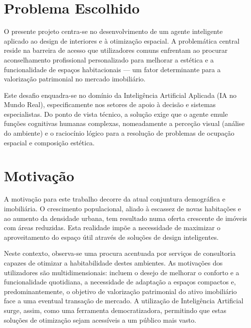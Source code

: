 \documentclass[a4paper,12pt]{scrreprt}
\begin{document}
    \section{Problema Escolhido}
        O presente projeto centra-se no desenvolvimento de um agente inteligente aplicado ao design de interiores e à otimização espacial. A problemática central reside na barreira de acesso que utilizadores comuns enfrentam ao procurar aconselhamento profissional personalizado para melhorar a estética e a funcionalidade de espaços habitacionais — um fator determinante para a valorização patrimonial no mercado imobiliário.

        Este desafio enquadra-se no domínio da Inteligência Artificial Aplicada (IA no Mundo Real), especificamente nos setores de apoio à decisão e sistemas especialistas. Do ponto de vista técnico, a solução exige que o agente emule funções cognitivas humanas complexas, nomeadamente a perceção visual (análise do ambiente) e o raciocínio lógico para a resolução de problemas de ocupação espacial e composição estética.
    \section{Motivação}
        A motivação para este trabalho decorre da atual conjuntura demográfica e imobiliária. O crescimento populacional, aliado à escassez de novas habitações e ao aumento da densidade urbana, tem resultado numa oferta crescente de imóveis com áreas reduzidas. Esta realidade impõe a necessidade de maximizar o aproveitamento do espaço útil através de soluções de design inteligentes.

        Neste contexto, observa-se uma procura acentuada por serviços de consultoria capazes de otimizar a habitabilidade destes ambientes. As motivações dos utilizadores são multidimensionais: incluem o desejo de melhorar o conforto e a funcionalidade quotidiana, a necessidade de adaptação a espaços compactos e, predominantemente, o objetivo de valorização patrimonial do ativo imobiliário face a uma eventual transação de mercado. A utilização de Inteligência Artificial surge, assim, como uma ferramenta democratizadora, permitindo que estas soluções de otimização sejam acessíveis a um público mais vasto.



\end{document}
